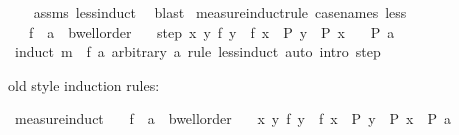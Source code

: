 \begin{isabellebody}
%
\isadelimproof
\ \ %
\endisadelimproof
%
\isatagproof
{}\isamarkupfalse%
\ assms\ less{\isacharunderscore}{\kern0pt}induct\ \isamarkupfalse%
\ blast%
\endisatagproof
{\isafoldproof}%
%
\isadelimproof
\isanewline
%
\endisadelimproof
\isanewline
{}\isamarkupfalse%
\ measure{\isacharunderscore}{\kern0pt}induct{\isacharunderscore}{\kern0pt}rule\ {\isacharbrackleft}{\kern0pt}case{\isacharunderscore}{\kern0pt}names\ less{\isacharbrackright}{\kern0pt}{\isacharcolon}{\kern0pt}\isanewline
\ \ \ f\ {\isacharcolon}{\kern0pt}{\isacharcolon}{\kern0pt}\ {\isachardoublequoteopen}{\isacharprime}{\kern0pt}a\ {\isasymRightarrow}\ {\isacharprime}{\kern0pt}b{\isacharcolon}{\kern0pt}{\isacharcolon}{\kern0pt}wellorder{\isachardoublequoteclose}\isanewline
\ \ \ step{\isacharcolon}{\kern0pt}\ {\isachardoublequoteopen}{\isasymAnd}x{\isachardot}{\kern0pt}\ {\isacharparenleft}{\kern0pt}{\isasymAnd}y{\isachardot}{\kern0pt}\ f\ y\ {\isacharless}{\kern0pt}\ f\ x\ {\isasymLongrightarrow}\ P\ y{\isacharparenright}{\kern0pt}\ {\isasymLongrightarrow}\ P\ x{\isachardoublequoteclose}\isanewline
\ \ \ {\isachardoublequoteopen}P\ a{\isachardoublequoteclose}\isanewline
%
\isadelimproof
\ \ %
\endisadelimproof
%
\isatagproof
{}\isamarkupfalse%
\ {\isacharparenleft}{\kern0pt}induct\ m\ {\isasymequiv}\ {\isachardoublequoteopen}f\ a{\isachardoublequoteclose}\ arbitrary{\isacharcolon}{\kern0pt}\ a\ rule{\isacharcolon}{\kern0pt}\ less{\isacharunderscore}{\kern0pt}induct{\isacharparenright}{\kern0pt}\ {\isacharparenleft}{\kern0pt}auto\ intro{\isacharcolon}{\kern0pt}\ step{\isacharparenright}{\kern0pt}%
\endisatagproof
{\isafoldproof}%
%
\isadelimproof
%
\endisadelimproof
%
\begin{isamarkuptext}%
old style induction rules:%
\end{isamarkuptext}\isamarkuptrue%
\isamarkupfalse%
\ measure{\isacharunderscore}{\kern0pt}induct{\isacharcolon}{\kern0pt}\isanewline
\ \ \ f\ {\isacharcolon}{\kern0pt}{\isacharcolon}{\kern0pt}\ {\isachardoublequoteopen}{\isacharprime}{\kern0pt}a\ {\isasymRightarrow}\ {\isacharprime}{\kern0pt}b{\isacharcolon}{\kern0pt}{\isacharcolon}{\kern0pt}wellorder{\isachardoublequoteclose}\isanewline
\ \ \ {\isachardoublequoteopen}{\isacharparenleft}{\kern0pt}{\isasymAnd}x{\isachardot}{\kern0pt}\ {\isasymforall}y{\isachardot}{\kern0pt}\ f\ y\ {\isacharless}{\kern0pt}\ f\ x\ {\isasymlongrightarrow}\ P\ y\ {\isasymLongrightarrow}\ P\ x{\isacharparenright}{\kern0pt}\ {\isasymLongrightarrow}\ P\ a{\isachardoublequoteclose}\isanewline

\end{isabellebody}
